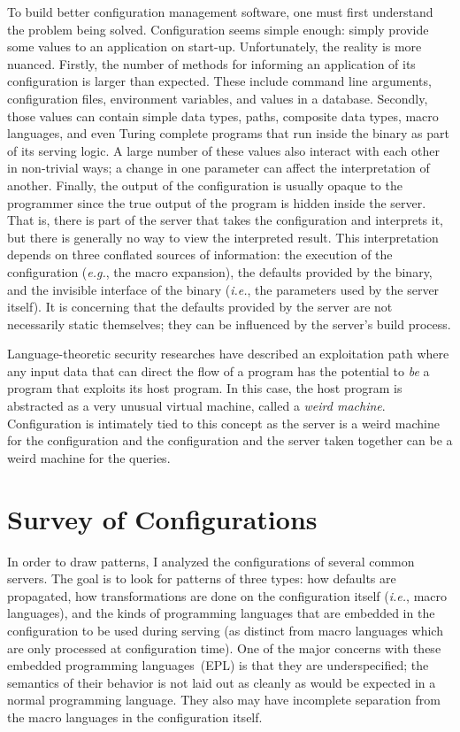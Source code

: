 \documentclass[letterpaper,twocolumn,10pt]{article}
\begin{document}
To build better configuration management software, one must first understand the problem being solved. Configuration seems simple enough: simply provide some values to an application on start-up. Unfortunately, the reality is more nuanced. Firstly, the number of methods for informing an application of its configuration is larger than expected. These include command line arguments, configuration files, environment variables, and values in a database. Secondly, those values can contain simple data types, paths, composite data types, macro languages, and even Turing complete programs that run inside the binary as part of its serving logic. A large number of these values also interact with each other in non-trivial ways; a change in one parameter can affect the interpretation of another. Finally, the output of the configuration is usually opaque to the programmer since the true output of the program is hidden inside the server. That is, there is part of the server that takes the configuration and interprets it, but there is generally no way to view the interpreted result. This interpretation depends on three conflated sources of information: the execution of the configuration (\emph{e.g.}, the macro expansion), the defaults provided by the binary, and the invisible interface of the binary (\emph{i.e.}, the parameters used by the server itself). It is concerning that the defaults provided by the server are not necessarily static themselves; they can be influenced by the server's build process.

Language-theoretic security researches have described an exploitation path where any input data that can direct the flow of a program has the potential to \emph{be} a program that exploits its host program. In this case, the host program is abstracted as a very unusual virtual machine, called a \emph{weird machine}.\cite{cats,weird} Configuration is intimately tied to this concept as the server is a weird machine for the configuration and the configuration and the server taken together can be a weird machine for the queries.

\section{Survey of Configurations}
In order to draw patterns, I analyzed the configurations of several common servers. The goal is to look for patterns of three types: how defaults are propagated, how transformations are done on the configuration itself (\emph{i.e.}, macro languages), and the kinds of programming languages that are embedded in the configuration to be used during serving (as distinct from macro languages which are only processed at configuration time). One of the major concerns with these embedded programming languages~(EPL) is that they are underspecified; the semantics of their behavior is not laid out as cleanly as would be expected in a normal programming language. They also may have incomplete separation from the macro languages in the configuration itself.
\end{document}

